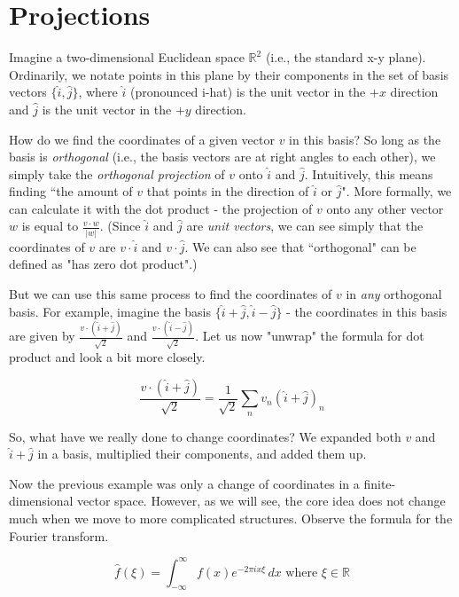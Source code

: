 \section{Projections}

Imagine a two-dimensional Euclidean space $\mathbb{R}^2$ (i.e., the standard x-y
plane). Ordinarily, we notate points in this plane by their components in the
set of basis vectors $\{\hat{i}, \hat{j}\}$, where $\hat{i}$ (pronounced i-hat)
is the unit vector in the $+x$ direction and $\hat{j}$ is the unit vector in the
$+y$ direction.

How do we find the coordinates of a given vector $v$ in this basis? So long as
the basis is \textit{orthogonal} (i.e., the basis vectors are at right angles to
each other), we simply take the \textit{orthogonal projection} of $v$ onto
$\hat{i}$ and $\hat{j}$. Intuitively, this means finding ``the amount of $v$
that points in the direction of $\hat{i}$ or $\hat{j}$". More formally, we can
calculate it with the dot product - the projection of $v$ onto any other vector
$w$ is equal to $\frac{v \cdot w}{|w|}$. (Since $\hat{i}$ and $\hat{j}$ are
\textit{unit vectors}, we can see simply that the coordinates of $v$ are
$v \cdot \hat{i}$ and $v \cdot \hat{j}$. We can also see that ``orthogonal" can
be defined as "has zero dot product".)

But we can use this same process to find the coordinates of $v$ in \textit{any}
orthogonal basis. For example, imagine the basis
$\{\hat{i} + \hat{j}, \hat{i} - \hat{j}\}$ - the coordinates in this basis are
given by $\frac{v \cdot (\hat{i} + \hat{j})}{\sqrt{2}}$ and
$\frac{v \cdot (\hat{i} - \hat{j})}{\sqrt{2}}$. Let us now "unwrap" the formula
for dot product and look a bit more closely.

\begin{equation*}
  \frac{v \cdot (\hat{i} + \hat{j})}{\sqrt{2}} = \frac{1}{\sqrt{2}} \sum_n v_n
    (\hat{i} + \hat{j})_n
\end{equation*}

So, what have we really done to change coordinates? We expanded both $v$ and
$\hat{i} + \hat{j}$ in a basis, multiplied their components, and added them up.

Now the previous example was only a change of coordinates in a
finite-dimensional vector space. However, as we will see, the core idea does not
change much when we move to more complicated structures. Observe the formula for
the Fourier transform.

\begin{equation*}
  \hat{f}(\xi) = \int_{-\infty}^\infty f(x) e^{-2\pi ix \xi} \,dx
    \text{ where } \xi \in \mathbb{R}
\end{equation*}

